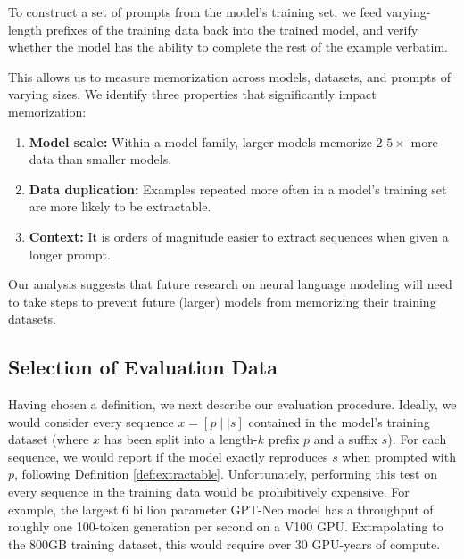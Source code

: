 To construct a set of prompts from the model's training set, 
we feed varying-length prefixes of the training data back into the trained model, and verify whether the model has the ability to complete the rest of the example verbatim.

%
This allows us to measure memorization across models, datasets, and prompts of varying sizes. We identify three properties that significantly impact memorization:

\begin{enumerate}
    \item \textbf{Model scale:} %
    Within a model family, larger models memorize $2$-$5\times$ more data than smaller models. 

    \item \textbf{Data duplication:} Examples repeated more often in a model's training set are more likely to be extractable.
    
    \item \textbf{Context:} It is orders of magnitude easier to extract sequences when given a longer prompt.
\end{enumerate}

Our analysis suggests that future research on neural language modeling will need to take steps
to prevent future (larger) models from memorizing their training datasets.

\subsection{Selection of Evaluation Data}

Having chosen a definition, we next describe our evaluation procedure.
%
Ideally, we would consider every sequence $x=[p \mid \mid s]$ contained in the model's training dataset (where $x$ has been split into a length-$k$ prefix $p$ and a suffix $s$). For each sequence, we would report if the model exactly reproduces $s$ when prompted with $p$, following Definition \ref{def:extractable}.
Unfortunately, performing this test on every sequence in the training data would be prohibitively expensive.
For example, the largest 6 billion parameter GPT-Neo model has a throughput of roughly one 100-token generation per second on a V100 GPU. Extrapolating to the 800GB training dataset, this would require over $30$ GPU-years of compute.

